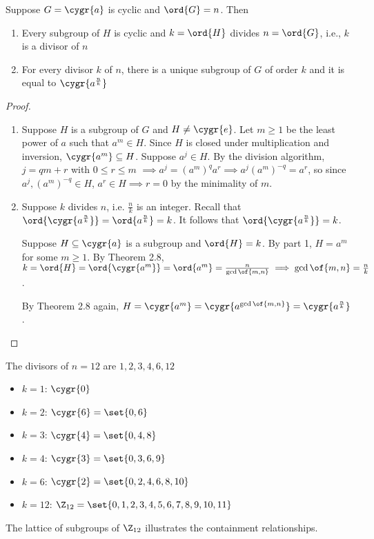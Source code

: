 \begin{theorem}
    Suppose $G = \cygr{a}$ is cyclic and $\ord{G} = n$. Then \begin{enumerate}
        \item Every subgroup of $H$ is cyclic and $k = \ord{H}$ divides $n = \ord{G}$, i.e., $k$ is a divisor of $n$
        \item For every divisor $k$ of $n$, there is a unique subgroup of $G$ of order $k$ and it is equal to $\cygr{a^{\frac{n}{k}}}$
    \end{enumerate}
\end{theorem}
\begin{proof}
    \begin{enumerate}
        \item Suppose $H$ is a subgroup of $G$ and $H \neq \cygr{e}$. Let $m \geq 1$ be the least power of $a$ such that $a^m \in H$. Since $H$ is closed under multiplication and inversion, $\cygr{a^m} \subseteq H$. Suppose $a^j \in H$. By the division algorithm, $j = qm + r$ with $0 \leq r \leq m$ $\implies a^j = \left(a^m\right)^q a^r \implies a^j \left(a^m\right)^{-q} = a^r$, so since $a^j,\left(a^m\right)^{-q} \in H$, $a^r \in H \implies r = 0$ by the minimality of $m$.
        \item Suppose $k$ divides $n$, i.e. $\frac{n}{k}$ is an integer. Recall that $\ord{\cygr{a^\frac{n}{k}}} = \ord{a^\frac{n}{k}} = k$. It follows that $\ord{\cygr{a^\frac{n}{k}}} = k$.
        
        Suppose $H \subseteq \cygr{a}$ is a subgroup and $\ord{H} = k$. By part 1, $H = a^m$ for some $m \geq 1$. By Theorem 2.8, $k = \ord{H} = \ord{\cygr{a^m}} = \ord{a^m} = \frac{n}{\gcd\of{m,n}} \implies \gcd\of{m,n} = \frac{n}{k}$.

        By Theorem 2.8 again, $H = \cygr{a^m} = \cygr{a^{\gcd\of{m,n}}} = \cygr{a^\frac{n}{k}}$.
    \end{enumerate}
\end{proof}

\newpage

\begin{example}
    The divisors of $n = 12$ are $1,2,3,4,6,12$
    \begin{itemize}
        \item $k = 1$: $\cygr{0}$
        \item $k = 2$: $\cygr{6} = \set{0,6}$
        \item $k = 3$: $\cygr{4} = \set{0,4,8}$
        \item $k = 4$: $\cygr{3} = \set{0,3,6,9}$
        \item $k = 6$: $\cygr{2} = \set{0,2,4,6,8,10}$
        \item $k = 12$: $\Z_{12} = \set{0,1,2,3,4,5,6,7,8,9,10,11}$
    \end{itemize}
    \begin{note}
        The lattice of subgroups of $\Z_{12}$ illustrates the containment relationships.
        \insertimage[0.5]
    \end{note}
\end{example}


